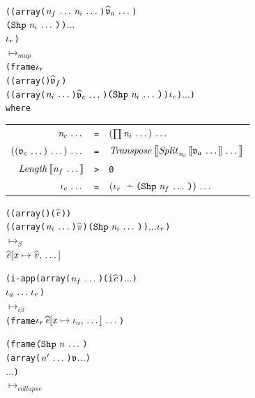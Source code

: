 {\begin{figure}
{\begin{alltt}
        \\\0((array ($\sequence{\nat_f}\sequence{\nat_i}$) $\sequence{\eatvalue_a}$)
        $\idxshape{\sequence{\nat_i}}$) $\dots$
        \\\0$\idx_r$)
        \\$\mapsto_{\mathit{map}}$\\
        (frame $\idx_r$
        \\\0((array () $\eatvalue_f$)
        ((array ($\sequence{\nat_i}$) $\sequence{\eatvalue_c}$) $\idxshape{\sequence{\nat_i}}$) $\idx_c$) $\dots$)
        \\\normalfont where\\
        \begin{tabular}{rcl}
          $\sequence{\nat_c}$
          & = &
                $\sequence{\parens{\prod{\sequence{\nat_i}}}}$ \\
          $\sequence{\parens{\sequence{\parens{\sequence{\atval_c}}}}}$
          & = &
                $\mathit{Transpose} \llb \sequence{\mathit{Split}_{\nat_c} \llb \sequence{\atval_a} \rrb} \rrb$ \\
          $\mathit{Length} \llb \sequence{\nat_f} \rrb$ & > & 0 \\
          $\sequence{\idx_c}$
          & = &
                $\sequence{\parens{\idx_r \thmonus \idxshape{\sequence{\nat_f}}}}$ \\
        \end{tabular}
      \end{alltt}} \smallskip
    {\begin{alltt}
        ((array () (\ttlm{$\sequence{\var}$} $\eexpr$))
        ((array ($\sequence{\nat_i}$) $\evalue$) $\idxshape{\sequence{\nat_i}}$) $\dots$ $\idx_r$)
        \\$\mapsto_{\mathit{\beta}}$
        $\seqsubst{\eexpr}{\var}{\evalue}$
      \end{alltt}} \smallskip
    {\begin{alltt}
        (i-app (array ($\sequence{\nat_f}$) (i\ttlm{$\sequence{\var}$} $\eexpr$) $\dots$)
        $\sequence{\idx_a}$ $\idx_r$)
        \\$\mapsto_{\mathit{i\beta}}$
        (frame $\idx_r$ $\sequence{\seqsubst{\eexpr}{\var}{\idx_a}}$)
      \end{alltt}} \smallskip
    {\begin{alltt}
        (frame $\idxshape{\sequence{\nat}}$
        (array ($\sequence{\nat'}$) $\atval$ $\dots$)
        $\dots$)
        \\$\mapsto_{\mathit{collapse}}$

\end{alltt}}
\end{figure}}
